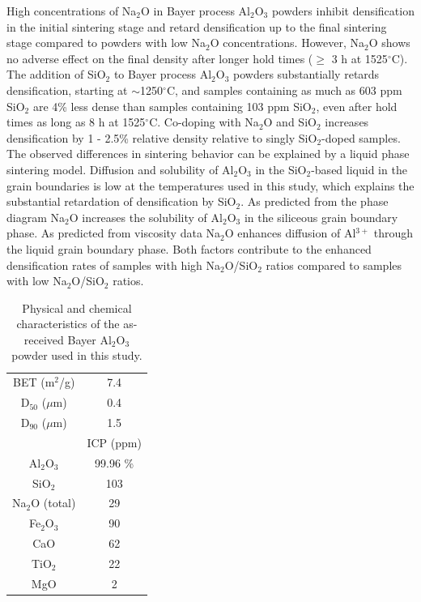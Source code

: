 High concentrations of Na$_{2}$O in Bayer process Al$_{2}$O$_{3}$ powders inhibit densification in the initial sintering stage and retard densification up to the final sintering stage compared to powders with low Na$_{2}$O concentrations. However, Na$_{2}$O shows no adverse effect on the final density after longer hold times ($\geq$ 3 h at 1525$^{\circ}$C). The addition of SiO$_{2}$ to Bayer process Al$_{2}$O$_{3}$ powders substantially retards densification, starting at $\sim$1250$^{\circ}$C, and samples containing as much as 603 ppm SiO$_{2}$ are 4\% less dense than samples containing 103 ppm SiO$_{2}$, even after hold times as long as 8 h at 1525$^{\circ}$C. Co-doping with Na$_{2}$O and SiO$_{2}$ increases densification by 1 - 2.5\% relative density relative to singly SiO$_{2}$-doped samples. The observed differences in sintering behavior can be explained by a liquid phase sintering model. Diffusion and solubility of Al$_{2}$O$_{3}$ in the SiO$_{2}$-based liquid in the grain boundaries is low at the temperatures used in this study, which explains the substantial retardation of densification by SiO$_{2}$. As predicted from the phase diagram Na$_{2}$O increases the solubility of Al$_{2}$O$_{3}$ in the siliceous grain boundary phase. As predicted from viscosity data Na$_{2}$O enhances diffusion of Al$^{3+}$ through the liquid grain boundary phase. Both factors contribute to the enhanced densification rates of samples with high Na$_{2}$O/SiO$_{2}$ ratios compared to samples with low Na$_{2}$O/SiO$_{2}$ ratios.

\newpage
\begin{table}[H]
	\caption{Physical and chemical characteristics of the as-received Bayer Al$_{2}$O$_{3}$ powder used in this study.}
	\centering
	\begin{tabular}{ | c | c | }
		\hline
		 & \\
		\hline
		BET (m$^{2}$/g) & 7.4 \\
		\hline
		D$_{50}$ ($\mu$m) & 0.4 \\
		\hline
		D$_{90}$ ($\mu$m) & 1.5 \\
		\hline
		 & ICP (ppm) \\
		\hline
		Al$_{2}$O$_{3}$ & 99.96 \% \\
		\hline
		SiO$_{2}$ & 103 \\
		\hline
		Na$_{2}$O (total) & 29 \\
		\hline
		Fe$_{2}$O$_{3}$ & 90 \\
		\hline
		CaO & 62 \\
		\hline
		TiO$_{2}$ & 22 \\
		\hline
		MgO & 2 \\
		\hline
	\end{tabular}
	\label{Ch2-table:table1}
\end{table}
\clearpage

